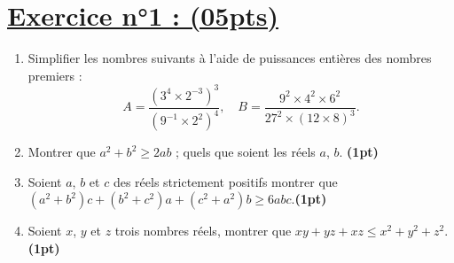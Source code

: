 \documentclass[12pt,a4paper]{article}
\begin{document}
\renewcommand{\arraystretch}{1.5}
\renewcommand{\arrayrulewidth}{1.2pt}
\vspace{3cm}
\section*{\underline{Exercice n°1 : (05pts)}}
\begin{enumerate}
\item Simplifier les nombres suivants à l'aide de puissances entières des nombres premiers :
\[
A = \dfrac{(3^4 \times 2^{-3})^3}{(9^{-1} \times 2^2)^4}, \quad B = \dfrac{9^2 \times 4^2 \times 6^2}{27^2 \times (12 \times 8)^3}.
\]

\item Montrer que $a^2 + b^2 \geq 2ab$ ; quels que soient les réels $a$, $b$.\hspace{1cm} \textbf{(1pt)}

\item Soient $a$, $b$ et $c$ des réels strictement positifs montrer que 
$(a^2 + b^2)c + (b^2 + c^2)a + (c^2 + a^2)b \geq 6abc$.\hspace{0.4cm}\textbf{(1pt)}

\item Soient $x$, $y$ et $z$ trois nombres réels, montrer que $xy + yz + xz \leq x^2 + y^2 + z^2$.\hspace{1cm}\textbf{(1pt)}
\end{enumerate}
\end{document}
